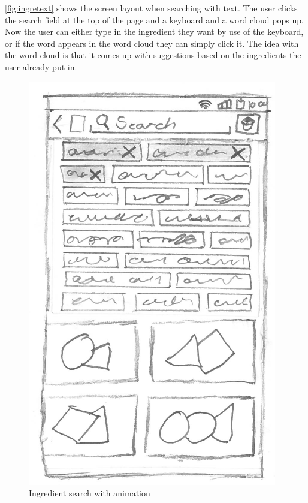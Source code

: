 \autoref{fig:ingretext} shows the screen layout when searching with text. The user clicks the search field at the top of the page and a keyboard and a word cloud pops up. Now the user can either type in the ingredient they want by use of the keyboard, or if the word appears in the word cloud they can simply click it. The idea with the word cloud is that it comes up with suggestions based on the ingredients the user already put in.

\begin{figure}[H]
\begin{minipage}[b]{0.5\columnwidth}
\centering
\includegraphics[width=0.7\columnwidth]{img/prototypes/ingredient_search_animation.pdf}
\caption{Ingredient search with animation\label{fig:ingreani}}
\end{minipage}
\hspace{0.5cm}
\begin{minipage}[b]{0.5\columnwidth}
\centering

\end{minipage}
\end{figure}
